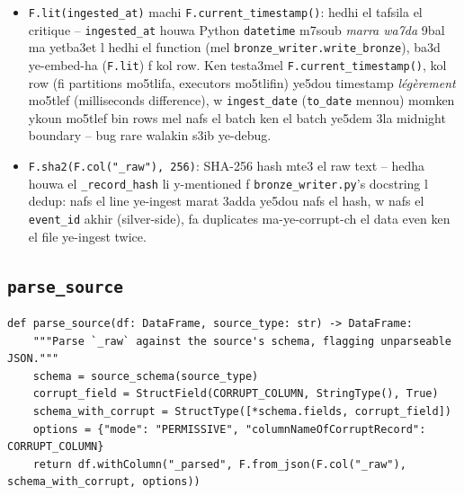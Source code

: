 \documentclass[11pt,a4paper]{report}
\DeclareRobustCommand{\code}[1]{\texttt{#1}}
\begin{document}
\begin{itemize}
  \item \code{F.lit(ingested\_at)} machi \code{F.current\_timestamp()}:
        hedhi el tafsila el critique -- \code{ingested\_at} houwa Python
        \code{datetime} m7soub \emph{marra wa7da} 9bal ma yetba3et l hedhi
        el function (mel \code{bronze\_writer.write\_bronze}), ba3d
        ye-embed-ha (\code{F.lit}) f kol row. Ken testa3mel
        \code{F.current\_timestamp()}, kol row (fi partitions mo5tlifa,
        executors mo5tlifin) ye5dou timestamp \emph{légèrement} mo5tlef
        (milliseconds difference), w \code{ingest\_date} (\code{to\_date}
        mennou) momken ykoun mo5tlef bin rows mel nafs el batch ken el
        batch ye5dem 3la midnight boundary -- bug rare walakin s3ib
        ye-debug.
  \item \code{F.sha2(F.col("\_raw"), 256)}: SHA-256 hash mte3 el raw text
        -- hedha houwa el \code{\_record\_hash} li y-mentioned f
        \code{bronze\_writer.py}'s docstring l dedup: nafs el line ye-ingest
        marat 3adda ye5dou nafs el hash, w nafs el \code{event\_id} akhir
        (silver-side), fa duplicates ma-ye-corrupt-ch el data even ken
        el file ye-ingest twice.
\end{itemize}

\subsection{\code{parse\_source}}

\begin{lstlisting}[style=pystyle]
def parse_source(df: DataFrame, source_type: str) -> DataFrame:
    """Parse `_raw` against the source's schema, flagging unparseable JSON."""
    schema = source_schema(source_type)
    corrupt_field = StructField(CORRUPT_COLUMN, StringType(), True)
    schema_with_corrupt = StructType([*schema.fields, corrupt_field])
    options = {"mode": "PERMISSIVE", "columnNameOfCorruptRecord": CORRUPT_COLUMN}
    return df.withColumn("_parsed", F.from_json(F.col("_raw"), schema_with_corrupt, options))
\end{lstlisting}
\end{document}
